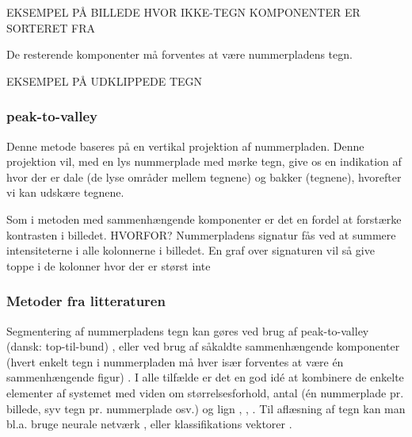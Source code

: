 EKSEMPEL PÅ BILLEDE HVOR IKKE-TEGN KOMPONENTER ER SORTERET FRA

De resterende komponenter må forventes at være nummerpladens tegn.

EKSEMPEL PÅ UDKLIPPEDE TEGN


\subsubsection*{peak-to-valley}

Denne metode baseres på en vertikal projektion af nummerpladen. Denne projektion vil, med en lys nummerplade med mørke tegn, give os en indikation af hvor der er dale (de lyse områder mellem tegnene) og bakker (tegnene), hvorefter vi kan udskære tegnene.

Som i metoden med sammenhængende komponenter er det en fordel at forstærke kontrasten i billedet. HVORFOR? Nummerpladens signatur fås ved at summere intensiteterne i alle kolonnerne i billedet. En graf over signaturen vil så give toppe i de kolonner hvor der er størst inte

\subsubsection{Metoder fra litteraturen}

Segmentering af nummerpladens tegn kan gøres ved brug af peak-to-valley (dansk: top-til-bund) \cite{ron}, \cite{kwas} eller ved brug af såkaldte sammenhængende komponenter (hvert enkelt tegn i nummerpladen må hver især forventes at være én sammenhængende figur) \cite{nijhuis}. I alle tilfælde er det en god idé at kombinere de enkelte elementer af systemet med viden om størrelsesforhold, antal (én nummerplade pr. billede, syv tegn pr. nummerplade osv.) og lign \cite{nijhuis}, \cite{parker}, \cite{kwas}. Til aflæsning af tegn kan man bl.a. bruge neurale netværk \cite{nijhuis}, \cite{kwas} eller klassifikations vektorer \cite{arth}.






